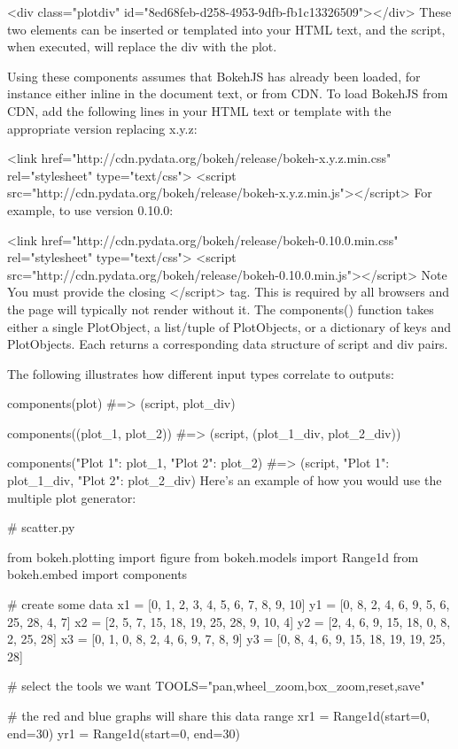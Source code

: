 <div class="plotdiv" id="8ed68feb-d258-4953-9dfb-fb1c13326509"></div>
These two elements can be inserted or templated into your HTML text, and the script, when executed, will replace the div with the plot.

Using these components assumes that BokehJS has already been loaded, for instance either inline in the document text, or from CDN. To load BokehJS from CDN, add the following lines in your HTML text or template with the appropriate version replacing x.y.z:

<link
    href="http://cdn.pydata.org/bokeh/release/bokeh-x.y.z.min.css"
    rel="stylesheet" type="text/css">
<script src="http://cdn.pydata.org/bokeh/release/bokeh-x.y.z.min.js"></script>
For example, to use version 0.10.0:

<link
    href="http://cdn.pydata.org/bokeh/release/bokeh-0.10.0.min.css"
    rel="stylesheet" type="text/css">
<script src="http://cdn.pydata.org/bokeh/release/bokeh-0.10.0.min.js"></script>
Note
You must provide the closing </script> tag. This is required by all browsers and the page will typically not render without it.
The components() function takes either a single PlotObject, a list/tuple of PlotObjects, or a dictionary of keys and PlotObjects. Each returns a corresponding data structure of script and div pairs.

The following illustrates how different input types correlate to outputs:

components(plot)
#=> (script, plot_div)

components((plot_1, plot_2))
#=> (script, (plot_1_div, plot_2_div))

components({"Plot 1": plot_1, "Plot 2": plot_2})
#=> (script, {"Plot 1": plot_1_div, "Plot 2": plot_2_div})
Here’s an example of how you would use the multiple plot generator:

# scatter.py

from bokeh.plotting import figure
from bokeh.models import Range1d
from bokeh.embed import components

# create some data
x1 = [0, 1, 2, 3, 4, 5, 6, 7, 8, 9, 10]
y1 = [0, 8, 2, 4, 6, 9, 5, 6, 25, 28, 4, 7]
x2 = [2, 5, 7, 15, 18, 19, 25, 28, 9, 10, 4]
y2 = [2, 4, 6, 9, 15, 18, 0, 8, 2, 25, 28]
x3 = [0, 1, 0, 8, 2, 4, 6, 9, 7, 8, 9]
y3 = [0, 8, 4, 6, 9, 15, 18, 19, 19, 25, 28]

# select the tools we want
TOOLS="pan,wheel_zoom,box_zoom,reset,save"

# the red and blue graphs will share this data range
xr1 = Range1d(start=0, end=30)
yr1 = Range1d(start=0, end=30)

